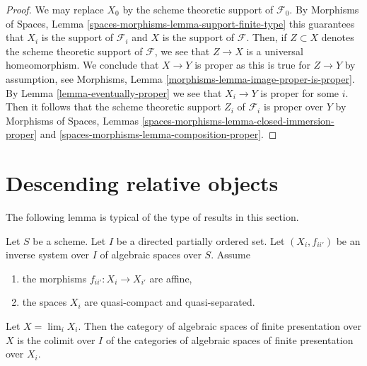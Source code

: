 \begin{proof}
We may replace $X_0$ by the scheme theoretic support of $\mathcal{F}_0$.
By Morphisms of Spaces, Lemma \ref{spaces-morphisms-lemma-support-finite-type}
this guarantees that $X_i$ is the support of $\mathcal{F}_i$ and $X$ is the
support of $\mathcal{F}$. Then, if $Z \subset X$ denotes the scheme
theoretic support of $\mathcal{F}$, we see that $Z \to X$ is a universal
homeomorphism. We conclude that $X \to Y$ is proper as this is true for
$Z \to Y$ by assumption, see
Morphisms, Lemma \ref{morphisms-lemma-image-proper-is-proper}.
By Lemma \ref{lemma-eventually-proper} we see that $X_i \to Y$ is proper
for some $i$. Then it follows that the scheme theoretic support $Z_i$ of
$\mathcal{F}_i$ is proper over $Y$ by
Morphisms of Spaces, Lemmas
\ref{spaces-morphisms-lemma-closed-immersion-proper} and
\ref{spaces-morphisms-lemma-composition-proper}.
\end{proof}














\section{Descending relative objects}
\label{section-descending-relative}

\noindent
The following lemma is typical of the type of results in this section.

\begin{lemma}
\label{lemma-descend-finite-presentation}
Let $S$ be a scheme. Let $I$ be a directed partially ordered set.
Let $(X_i, f_{ii'})$ be an inverse system over $I$ of algebraic spaces
over $S$. Assume
\begin{enumerate}
\item the morphisms $f_{ii'} : X_i \to X_{i'}$ are affine,
\item the spaces $X_i$ are quasi-compact and quasi-separated.
\end{enumerate}
Let $X = \lim_i X_i$. Then the category of algebraic spaces
of finite presentation over $X$ is the colimit over $I$ of the
categories of algebraic spaces of finite presentation over $X_i$.
\end{lemma}

